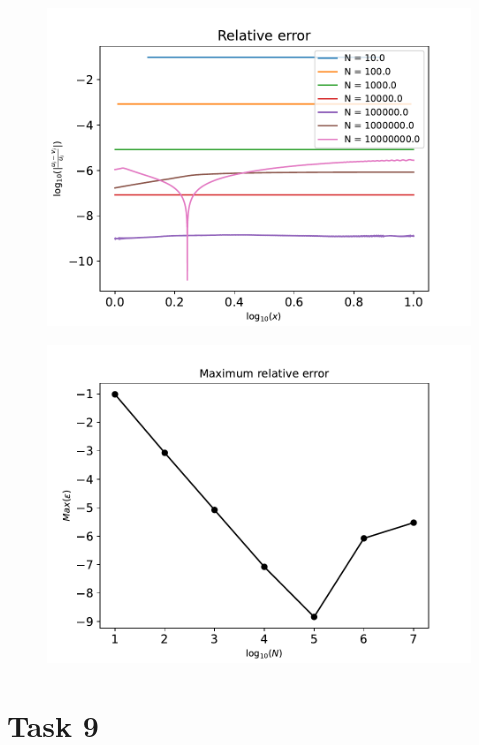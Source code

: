 \documentclass[english,notitlepage]{revtex4-1}  %
\begin{document}
    \begin{figure}[!ht]
        \centering
        \includegraphics[scale=0.7]{rel_error.pdf}
        \caption{}
        \label{rel_error}
    \end{figure}

    \begin{figure}[!ht]
        \centering
        \includegraphics[scale=0.7]{max_error.pdf}
        \caption{}
        \label{max_error}
    \end{figure}


\section*{Task 9}
\end{document}

